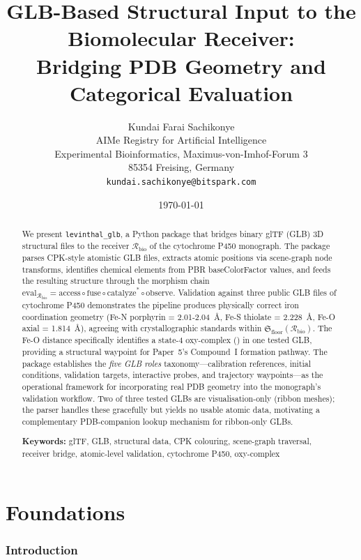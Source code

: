 \documentclass[11pt,twocolumn,a4paper]{article}
\title{\textbf{GLB-Based Structural Input to the Biomolecular Receiver:\\
Bridging PDB Geometry and Categorical Evaluation}}
\author{
Kundai Farai Sachikonye\\[0.3em]
AIMe Registry for Artificial Intelligence\\
Experimental Bioinformatics, Maximus-von-Imhof-Forum 3\\
85354 Freising, Germany\\
\texttt{kundai.sachikonye@bitspark.com}
}
\theoremstyle{definition}
\theoremstyle{remark}
\newcommand{\Recv}{\mathcal{R}}
\newcommand{\Floor}{\mathfrak{S}_{\mathrm{floor}}}
\newcommand{\eval}{\mathrm{eval}}
\begin{document}
\maketitle

\date{\today}

\begin{abstract}
We present \texttt{levinthal\_glb}, a Python package that bridges
binary glTF (GLB) 3D structural files to the receiver $\Recv_{\mathrm{bio}}$
of the cytochrome P450 monograph. The package parses CPK-style atomistic
GLB files, extracts atomic positions via scene-graph node transforms,
identifies chemical elements from PBR baseColorFactor values, and feeds
the resulting structure through the morphism chain
$\eval_{\Recv_{\mathrm{bio}}} = \mathrm{access} \circ \mathrm{fuse} \circ
\mathrm{catalyze}^* \circ \mathrm{observe}$. Validation against three
public GLB files of cytochrome P450 demonstrates the pipeline produces
physically correct iron coordination geometry (Fe-N porphyrin = 2.01-2.04~\AA,
Fe-S thiolate = 2.228~\AA, Fe-O axial = 1.814~\AA), agreeing with
crystallographic standards within $\Floor(\Recv_{\mathrm{bio}})$.
The Fe-O distance specifically identifies a state-4 oxy-complex
() in one tested GLB, providing a structural waypoint for
Paper~5's Compound~I formation pathway. The package establishes the
\emph{five GLB roles} taxonomy---calibration references, initial
conditions, validation targets, interactive probes, and trajectory
waypoints---as the operational framework for incorporating real PDB
geometry into the monograph's validation workflow. Two of three tested
GLBs are visualisation-only (ribbon meshes); the parser handles these
gracefully but yields no usable atomic data, motivating a complementary
PDB-companion lookup mechanism for ribbon-only GLBs.

\medskip
\noindent\textbf{Keywords:} glTF, GLB, structural data, CPK colouring,
scene-graph traversal, receiver bridge, atomic-level validation,
cytochrome P450, oxy-complex
\end{abstract}



\part{Foundations}

\section{Introduction}
\label{sec:introduction}
\end{document}
